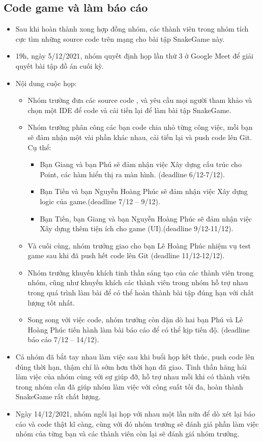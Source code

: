 \documentclass[13pt,a4paper]{article}
\begin{document}
\subsection{Code game và làm báo cáo}
\begin{itemize}
    \item Sau khi hoàn thành xong hợp đồng nhóm, các thành viên trong nhóm tích cực tìm những source code trên mạng cho bài tập SnakeGame này. 
    \item 19h, ngày 5/12/2021, nhóm quyết định họp lần thứ 3 ở Google Meet để giải quyết bài tập đồ án cuối kỳ.
    \item Nội dung cuộc họp:
    \begin{itemize}
        \item Nhóm trưởng đưa các source code , và yêu cầu mọi người tham khảo và chọn một IDE để code và   cải tiến lại để làm bài tập SnakeGame.
        \item Nhóm trưởng phân công các bạn code chia nhỏ từng công việc, mỗi bạn sẽ đảm nhận một vài phần khác nhau,  cải tiến lại và push code lên Git. Cụ thể:
            \begin{itemize}
                \item  Bạn Giang và bạn Phú sẽ đảm nhận việc Xây dựng cấu trúc cho Point, các hàm hiển thị ra màn hình. (deadline 6/12-7/12).
                \item Bạn Tiến và bạn Nguyễn Hoàng Phúc sẽ đảm nhận việc Xây dựng logic của game.(deadline 7/12 – 9/12).
                \item Bạn Tiến, bạn Giang và bạn Nguyễn Hoàng Phúc sẽ đảm nhận việc Xây dựng thêm tiện ích cho game (UI).(deadline 9/12-11/12).
            \end{itemize}
        \item Và cuối cùng, nhóm trưởng giao cho bạn Lê Hoàng Phúc nhiệm vụ test game sau khi đã push hết code lên Git (deadline 11/12-12/12).
        \item Nhóm trưởng khuyến khích tinh thần sáng tạo của các thành viên trong nhóm, cũng như khuyến khích các thành viên trong nhóm hỗ trợ nhau trong quá trình làm bài để có thể hoàn thành bài tập đúng hạn với chất lượng tốt nhất.
        \item Song song với việc code, nhóm trưởng còn dặn dò hai bạn Phú và Lê Hoàng Phúc tiến hành làm bài báo cáo để có thể kịp tiến độ. (deadline báo cáo 7/12 – 14/12).
        \end{itemize}
    \item Cả nhóm đã bắt tay nhau làm việc sau khi buổi họp kết thúc, push code lên đúng thời hạn, thậm chí là sớm hơn thời hạn đã giao. Tinh thần hăng hái làm việc của nhóm cùng với sự giúp đỡ, hỗ trợ nhau mỗi khi có thành viên trong nhóm cần đã giúp nhóm làm việc với công suất tối đa, hoàn thành SnakeGame rất chất lượng.
    \item Ngày 14/12/2021, nhóm ngồi lại họp với nhau một lần nữa để dò xét lại báo cáo và code thật kĩ càng, cùng với đó nhóm trưởng sẽ đánh giá phần làm việc nhóm của từng bạn và các thành viên còn lại sẽ đánh giá nhóm trưởng.
\end{itemize}
\end{document}
